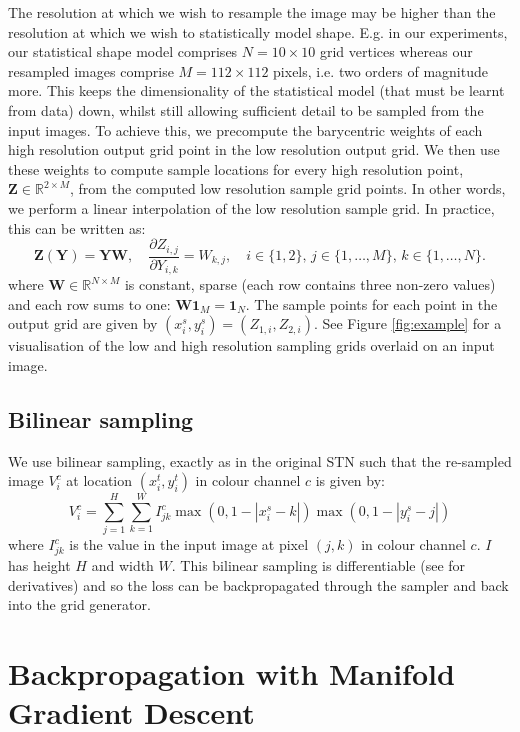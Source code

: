 \documentclass[runningheads]{llncs}
\newcommand{\R}{\mathbb{R}}
\begin{document}
The resolution at which we wish to resample the image may be higher than the resolution at which we wish to statistically model shape. E.g. in our experiments, our statistical shape model comprises $N = 10\times 10$ grid vertices whereas our resampled images comprise $M = 112\times 112$ pixels, i.e. two orders of magnitude more. This keeps the dimensionality of the statistical model (that must be learnt from data) down, whilst still allowing sufficient detail to be sampled from the input images. To achieve this, we precompute the barycentric weights of each high resolution output grid point in the low resolution output grid. We then use these weights to compute sample locations for every high resolution point, $\mathbf{Z}\in\R^{2\times M}$, from the computed low resolution sample grid points. In other words, we perform a linear interpolation of the low resolution sample grid. In practice, this can be written as:
\begin{equation}
    \mathbf{Z}(\mathbf{Y}) = \mathbf{YW},\quad  \frac{\partial Z_{i,j}}{\partial Y_{i,k}}=W_{k,j},\quad i\in\{1,2\},\, j\in\{1,\dots,M\},\, k\in\{1,\dots,N\}.
\end{equation}
where $\mathbf{W}\in\R^{N\times M}$ is constant, sparse (each row contains three non-zero values) and each row sums to one: $\mathbf{W1}_M=\mathbf{1}_N$.
The sample points for each point in the output grid are given by $(x_i^s,y_i^s)=(Z_{1,i},Z_{2,i})$. See Figure \ref{fig:example} for a visualisation of the low and high resolution sampling grids overlaid on an input image.

\subsection{Bilinear sampling}
We use bilinear sampling, exactly as in the original STN such that the re-sampled image $V_i^c$ at location $(x_i^t,y_i^t)$ in colour channel $c$ is given by:
\begin{equation*}
    V_i^c = \sum_{j=1}^H\sum_{k=1}^W I_{jk}^c \max(0,1-|x_i^s-k|)\max(0,1-|y_i^s-j|)
\end{equation*}
where $I_{jk}^c$ is the value in the input image at pixel $(j,k)$ in colour channel $c$. $I$ has height $H$ and width $W$. This bilinear sampling is differentiable (see \cite{jaderberg2015spatial} for derivatives) and so the loss can be backpropagated through the sampler and back into the grid generator.

\section{Backpropagation with Manifold Gradient Descent}\label{sec:manopt}
\end{document}
